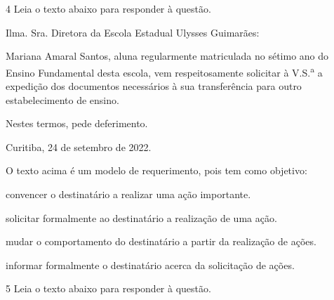 \pagebreak

\num{4} Leia o texto abaixo para responder à questão.

\begin{myquote}

Ilma. Sra. Diretora da Escola Estadual Ulysses Guimarães:

Mariana Amaral Santos, aluna regularmente matriculada no sétimo ano do
Ensino Fundamental desta escola, vem respeitosamente solicitar à V.S.\textsuperscript{a} a
expedição dos documentos necessários à sua transferência para outro
estabelecimento de ensino.

Nestes termos, pede deferimento.

Curitiba, 24 de setembro de 2022.


\end{myquote}

O texto acima é um modelo de requerimento, pois tem como objetivo:

\begin{escolha} 

\item convencer o destinatário a realizar uma ação importante.

\item solicitar formalmente ao destinatário a realização de uma ação.

\item mudar o comportamento do destinatário a partir da realização de ações.

\item informar formalmente o destinatário acerca da solicitação de ações.

\end{escolha}

\num{5} Leia o texto abaixo para responder à questão.

